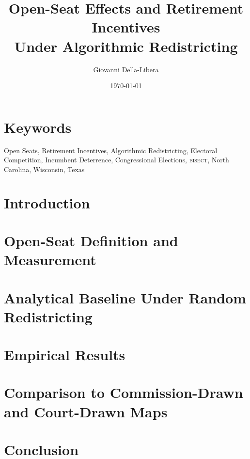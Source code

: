 \documentclass[12pt]{article}
\title{\textbf{Open-Seat Effects and Retirement Incentives\\
Under Algorithmic Redistricting}}
\author{Giovanni Della-Libera}
\date{\today}
\begin{document}
\maketitle

\begin{abstract}

\end{abstract}

\section*{Keywords}
Open Seats, Retirement Incentives, Algorithmic Redistricting, Electoral Competition,
Incumbent Deterrence, Congressional Elections, \textsc{bisect},
North Carolina, Wisconsin, Texas

\section{Introduction}


\section{Open-Seat Definition and Measurement}


\section{Analytical Baseline Under Random Redistricting}


\section{Empirical Results}


\section{Comparison to Commission-Drawn and Court-Drawn Maps}


\section{Conclusion}




\end{document}
